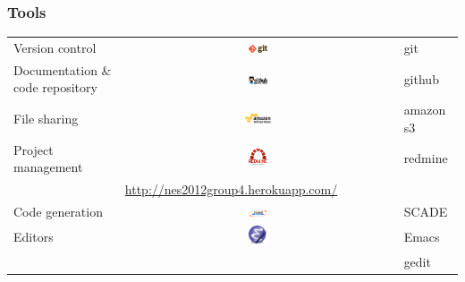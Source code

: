 \documentclass{beamer}
\theoremstyle{definition} \newtheorem{mdefinition}{Definition}
\theoremstyle{plain} \newtheorem{mtheorem}{Theorem}
\theoremstyle{plain} \newtheorem{mcorollary}{Corollary}
\theoremstyle{plain} \newtheorem{mfact}{Fact}
\begin{document}
\begin{frame}
	\frametitle{Tools}

\begin{tabular}{lcl}

Version control & \includegraphics[width=0.07\textwidth]{img/gitlogo} & git\\
Documentation \& code repository & \includegraphics[width=0.07\textwidth]{img/github-logo} & github\\
File sharing & \includegraphics[width=0.1\textwidth]{img/aws-logo} & amazon s3\\
Project management & \includegraphics[width=0.07\textwidth]{img/redmine-logo} & redmine\\
		& \multicolumn{2}{l}{\tiny{\href{http://nes2012group4.herokuapp.com/}{http://nes2012group4.herokuapp.com/}}}\\
Code generation & \includegraphics[width=0.07\textwidth]{img/scade-logo} & SCADE\\
Editors & \includegraphics[width=0.07\textwidth]{img/emacs-logo} & Emacs\\
        & & gedit\\

\end{tabular}

\end{frame}

\end{document}

